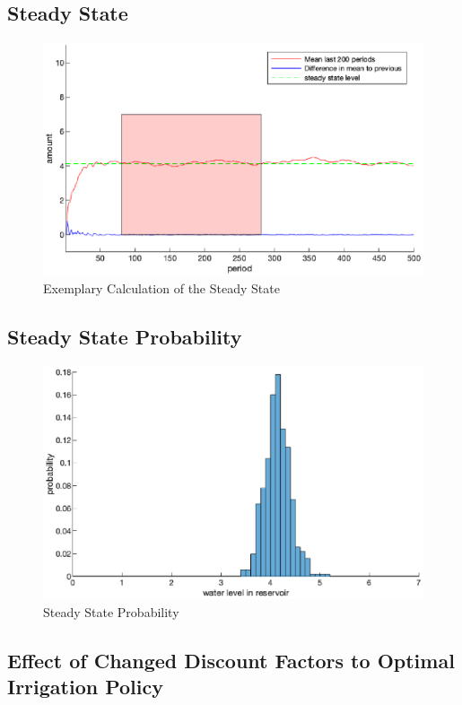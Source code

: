 \documentclass[12pt, a4paper, oneside]{article}
\begin{document}
	\subsection{Steady State}
	\begin{figure}[ht]
		\includegraphics[width=1\textwidth]{figures/steadyState.eps}
		\caption{Exemplary Calculation of the Steady State}
		\label{fig:steadyState}
	\end{figure}
	\subsection{Steady State Probability}
	\begin{figure}[ht]
		\includegraphics[width=1\textwidth]{figures/steadyStateMonteCarlo.eps}
		\caption{Steady State Probability}
		\label{fig:steadyStateMonteCarlo}
	\end{figure}
	\subsection{Effect of Changed Discount Factors to Optimal Irrigation Policy}
\end{document}
